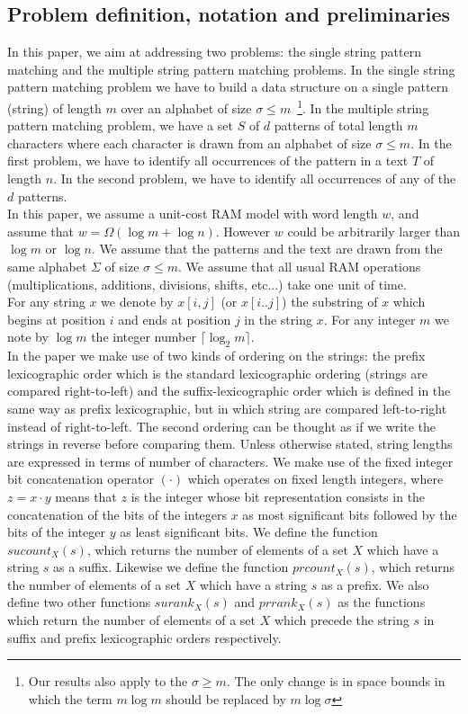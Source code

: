 \documentclass{article}
\newcommand{\?}{\mskip1.5mu}
\begin{document}
\subsection{Problem definition, notation and preliminaries}
In this paper, we aim at addressing two problems: the single string pattern matching and the multiple string pattern matching problems. In the single string pattern matching problem we have to build a data structure on a single pattern (string) of length $m$ over an alphabet of size $\sigma\leq m$~\footnote{Our results also apply to the $\sigma\geq m$. The only change is in space bounds in which the term $m\log m$ should be replaced by $m\log\sigma$}. In the multiple string pattern matching problem, we have a set $S$ of $d$ patterns of total length $m$ characters where each character is drawn from an alphabet of size $\sigma\leq m$. In the first problem, we have to identify all occurrences of the pattern in a text $T$ of length $n$. In the second problem, we have to identify all occurrences of any of the $d$ patterns. 
\\
In this paper, we assume a unit-cost RAM model with word length $w$, and assume that $w=\Omega(\log m+\log n)$. However $w$ could be arbitrarily larger than $\log m$ or $\log n$. We assume that the patterns and the text are drawn from the same alphabet $\Sigma$ of size $\sigma\leq m$. We assume that all usual RAM operations (multiplications, additions, divisions, shifts, etc...) take one unit of time. 
\\For any string $x$ we denote by $x[i,j]$ (or $x[i..j]$) the substring of $x$ which begins at position $i$ and ends at position $j$ in the string $x$. 
For any integer $m$ we note by $\log m$ the integer number $\lceil \log_2 m\rceil$.
\\
In the paper we make use of two kinds of ordering on the strings: the prefix lexicographic order which is the standard lexicographic ordering (strings are compared right-to-left) and the suffix-lexicographic order which is defined in the same way as prefix lexicographic, but in which string are compared left-to-right instead of right-to-left. The second ordering can be thought as if we write the strings in reverse before comparing them. Unless otherwise stated, string lengths are expressed in terms of number of characters. We make use of the fixed integer bit concatenation operator $(\cdot)$ which operates on fixed length integers, where $z=x\cdot y$ means that $z$ is the integer whose bit representation consists in the concatenation of the bits of the integers $x$ as most significant bits followed by the bits of the integer $y$ as least significant bits. 
We define the function $sucount_X(s)$, which returns the number of elements of a set $X$ which have a string $s$ as a suffix. Likewise we define the function $prcount_X(s)$, which returns the number of elements of a set $X$ which have a string $s$ as a prefix. 
We also define two other functions $surank_X(s)$ and $prrank_X(s)$ as the functions which return the number of elements of a set $X$ which precede the string $s$ in suffix and prefix lexicographic orders respectively.
\end{document}
